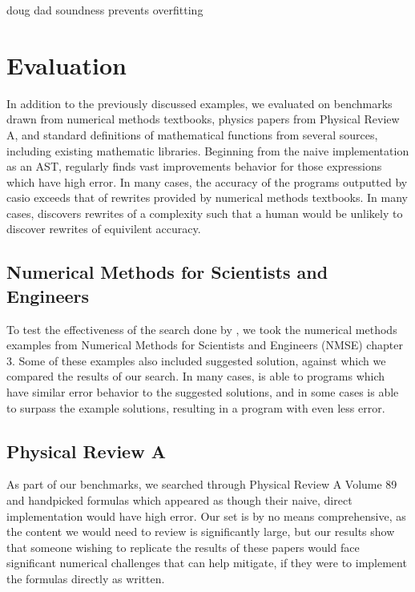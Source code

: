 \documentclass[paper.tex]{subfiles}
\begin{document}
doug dad soundness prevents overfitting

\section{Evaluation}
\label{sec:evaluation}


In addition to the previously discussed examples,
we evaluated \casio on benchmarks drawn from
numerical methods textbooks,
physics papers from Physical Review A,
and standard definitions of mathematical functions from several sources,
including existing mathematic libraries.
Beginning from the naive implementation as an AST,
\casio regularly finds vast improvements behavior for those expressions which have high error.
In many cases, the accuracy of the programs outputted by casio 
exceeds that of rewrites provided by numerical methods textbooks.
In many cases, \casio discovers rewrites of a complexity 
such that a human would be unlikely to discover rewrites of equivilent accuracy.

\subsection{Numerical Methods for Scientists and Engineers}

To test the effectiveness of the search done by \casio,
we took the numerical methods examples from
Numerical Methods for Scientists and Engineers (NMSE) chapter 3.
Some of these examples also included suggested solution,
against which we compared the results of our search.
In many cases, \casio is able to programs which have
similar error behavior to the suggested solutions,
and in some cases \casio is able to surpass the
example solutions, resulting in a program with even less error.

\subsection{Physical Review A}

As part of our benchmarks, we searched through Physical Review A Volume 89
and handpicked formulas which appeared as though
their naive, direct implementation would have high error.
Our set is by no means comprehensive,
as the content we would need to review is significantly large,
but our results show that someone wishing to replicate the results of these papers
would face significant numerical challenges that \casio can help mitigate,
if they were to implement the formulas directly as written.
\end{document}
